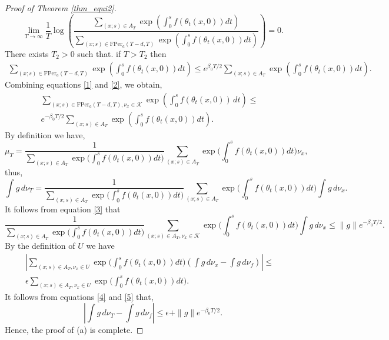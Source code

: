 \documentclass[letterpaper,11pt]{amsart}
\numberwithin{equation}{section}     %
\newcommand{\K}{\mathcal{K}}
\begin{document}
\begin{proof}[Proof of Theorem \ref{thm_equi2}]
\begin{equation*}
\lim_{T \to \infty} \frac{1}{T} \log \left(	\frac{ \sum_{(x;s)\in A_T}\exp\left(\int_0^{s}f(\theta_t(x,0))dt\right)}{ \sum_{(x;s)\in \mathrm{FPer}_a(T-d,T)}\exp\left(\int_0^{s}f(\theta_t(x,0))dt\right)}	\right)=0.
\end{equation*}
There exists $T_2>0$ such that. if $T>T_2$ then
\begin{align} \label{2}
 \sum_{(x;s)\in \mathrm{FPer}_a(T-d,T)}\exp\left(\int_0^{s}f(\theta_t(x,0))dt\right) \leq e^{\beta_0  T/2} \sum_{(x;s)\in A_T}\exp\left(\int_0^{s}f(\theta_t(x,0))dt\right).
 \end{align}
Combining equations \eqref{1} and \eqref{2}, we obtain, 
\begin{align} \label{3} 
\sum_{(x;s)\in \mathrm{FPer}_a(T-d,T), \nu_{x}\in \mathcal{K}}\exp\left(\int_0^{s}f(\theta_t(x,0)) \,dt\right)
\leq &\\  e^{-\beta_0 T/2}    \sum_{(x;s)\in A_T}\exp\left(\int_0^{s}f(\theta_t(x,0))dt\right).
\end{align} 
By definition we have, 
\begin{equation*}
\mu_T=\frac{1}{\sum_{(x;s)\in A_T}\exp\big(\int_0^{s}f(\theta_t(x,0))dt\big)}\sum_{(x;s)\in A_T}\exp\bigg(\int_0^{s}f(\theta_t(x,0))dt\bigg)\nu_x,
\end{equation*}
thus,
\begin{equation*}
\int g \, d \nu_T = \frac{1}{\sum_{(x;s)\in A_T}\exp\big(\int_0^{s}f(\theta_t(x,0))dt\big)} \sum_{(x;s)\in A_T}\exp\bigg(\int_0^{s}f(\theta_t(x,0))dt\bigg)   \int g \, d \nu_x.
\end{equation*}
It follows from equation \eqref{3} that
\begin{equation} \label{4}
\frac{1}{\sum_{(x;s)\in A_T}\exp\big(\int_0^{s}f(\theta_t(x,0))dt\big)}  \sum_{(x;s)\in A_T, \nu_x \in \K}\exp\bigg(\int_0^{s}f(\theta_t(x,0))dt\bigg)   \int g \, d \nu_x \leq \|g\| e^{-\beta_0 T/2}.
\end{equation}
By the definition of $U$ we have
\begin{eqnarray} \label{5}
\left| 	 \sum_{(x;s)\in A_T, \nu_x \in U}\exp\bigg(\int_0^{s}f(\theta_t(x,0))dt\bigg)  \left( \int g \, d \nu_x  -  \int g \, d \nu_f  \right) 
	\right| \leq &\\  \epsilon \sum_{(x;s)\in A_T, \nu_x \in U}\exp\bigg(\int_0^{s}f(\theta_t(x,0))dt\bigg).
\end{eqnarray}
It follows from  equations \eqref{4} and \eqref{5} that,
\begin{equation*}
\left|	\int g \, d \nu_T - \int g \, d \nu_f	\right| \leq \epsilon +\| g \| e^{-\beta_0 T/2}.
\end{equation*}
Hence, the proof of (a) is complete.






\end{proof}
\end{document}
